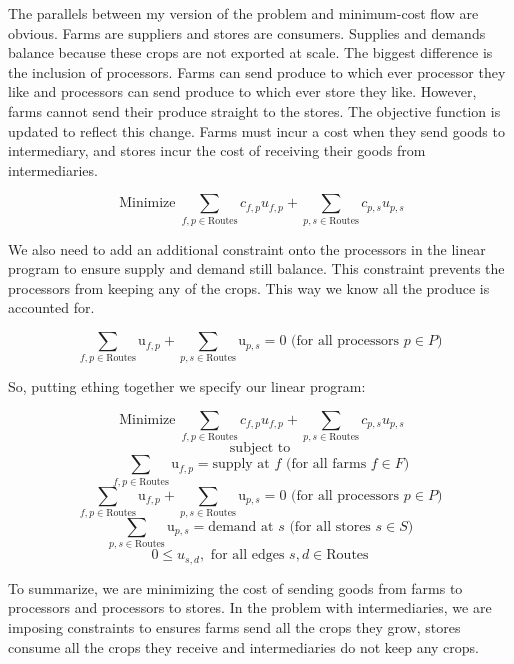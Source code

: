 \documentclass{report}
\begin{document}
The parallels between my version of the problem and minimum-cost flow are obvious. Farms are suppliers and stores are consumers. Supplies and demands balance because these crops are not exported at scale. The biggest difference is the inclusion of processors. Farms can send produce to which ever processor they like and processors can send produce to which ever store they like. However, farms cannot send their produce straight to the stores. The objective function is updated to reflect this change. Farms must incur a cost when they send goods to intermediary, and stores incur the cost of receiving their goods from intermediaries.

$$\operatorname{Minimize} \sum_{f,p \in \text{Routes}} c_{f,p} u_{f,p} + \sum_{p,s \in \text{Routes}} c_{p,s} u_{p,s}$$

We also need to add an additional constraint onto the processors in the linear program to ensure supply and demand still balance. This constraint prevents the processors from keeping any of the crops. This way we know all the produce is accounted for.

$$\sum_{f,p \in \text{Routes}} \text{u}_{f,p} + \sum_{p,s \in \text{Routes}} \text{u}_{p,s} = 0 \text{ (for all processors } p \in P)$$

So, putting ething together we specify our linear program:

$$\operatorname{Minimize} \sum_{f,p \in \text{Routes}} c_{f,p} u_{f,p} + \sum_{p,s \in \text{Routes}} c_{p,s} u_{p,s}$$
$$\text{subject to}$$
$$\sum_{f,p \in \text{Routes}} \text{u}_{f,p}= \text{supply at } f \text{ (for all farms } f \in F)$$
$$\sum_{f,p \in \text{Routes}} \text{u}_{f,p} + \sum_{p,s \in \text{Routes}} \text{u}_{p,s} = 0 \text{ (for all processors } p \in P)$$
$$\sum_{p,s \in \text{Routes}} \text{u}_{p,s}= \text{demand at } s \text{ (for all stores } s \in S)$$
$$0 \leq u_{s,d}, \text{ for all edges } s,d \in \text{Routes}$$

To summarize, we are minimizing the cost of sending goods from farms to processors and processors to stores. In the problem with intermediaries, we are imposing constraints to ensures farms send all the crops they grow, stores consume all the crops they receive and intermediaries do not keep any crops.
\end{document}
